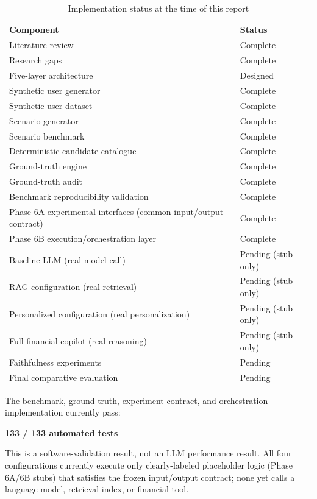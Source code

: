 \documentclass[12pt,a4paper]{article}
\begin{document}
\begin{table}[H]
\centering
\caption{Implementation status at the time of this report}
\label{tab:status}
\begin{tabular}{p{}p{}}
\toprule
Component & Status\\
\midrule
Literature review & Complete\\
Research gaps & Complete\\
Five-layer architecture & Designed\\
Synthetic user generator & Complete\\
Synthetic user dataset & Complete\\
Scenario generator & Complete\\
Scenario benchmark & Complete\\
Deterministic candidate catalogue & Complete\\
Ground-truth engine & Complete\\
Ground-truth audit & Complete\\
Benchmark reproducibility validation & Complete\\
Phase 6A experimental interfaces (common input/output contract) & Complete\\
Phase 6B execution/orchestration layer & Complete\\
Baseline LLM (real model call) & Pending (stub only)\\
RAG configuration (real retrieval) & Pending (stub only)\\
Personalized configuration (real personalization) & Pending (stub only)\\
Full financial copilot (real reasoning) & Pending (stub only)\\
Faithfulness experiments & Pending\\
Final comparative evaluation & Pending\\
\bottomrule
\end{tabular}
\end{table}

The benchmark, ground-truth, experiment-contract, and orchestration implementation currently pass:

\begin{center}
\Large\textbf{133 / 133 automated tests}
\end{center}

This is a software-validation result, not an LLM performance result. All four configurations currently execute only clearly-labeled placeholder logic (Phase 6A/6B stubs) that satisfies the frozen input/output contract; none yet calls a language model, retrieval index, or financial tool.
\end{document}
